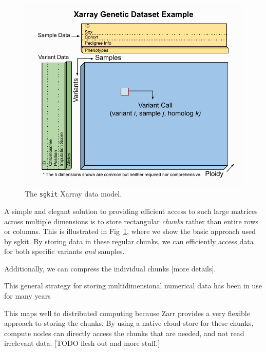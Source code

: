 \documentclass[9pt,lineno]{elife}
\newcommand{\toolname}[1]{\texttt{#1}}
\begin{document}
\begin{figure}
\includegraphics[width=\linewidth]{diagrams/sgkit_xarray_diagram.pdf}
\caption{The \toolname{sgkit} Xarray data model.}
\label{fig-data-layout}
\end{figure}

A simple and elegant solution to providing efficient access to such
large matrices across multiple dimensions is to store rectangular
\emph{chunks} rather than entire rows or columns. This is illustrated
in Fig~\ref{fig-data-layout}, where we show the basic approach
used by sgkit. By storing data in these regular chunks, we
can efficiently access data for both specific variants \emph{and}
samples.

Additionally, we can compress the individual chunks [more details].

This general strategy for storing multidimensional numerical data
has been in use for many years~\citep{folk2011overview}

This maps well to distributed computing because Zarr provides a
very flexible approach to storing the chunks. By using a native cloud store
for these chunks, compute nodes can directly access the chunks that
are needed, and not read irrelevant data.
[TODO flesh out and more stuff.]
\end{document}
